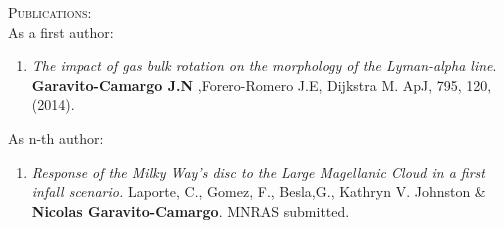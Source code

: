 \documentclass[letterpaper]{article}
\begin{document}
\textsc{\Large Publications:}\\

As a first author:\\
\begin{enumerate}
\item \textit{The impact of gas bulk rotation on the morphology of the
Lyman-alpha line}. \textbf{Garavito-Camargo J.N} ,Forero-Romero J.E, Dijkstra M. ApJ, 795, 120, (2014).\\
\end{enumerate}


As n-th author:\\

\begin{enumerate}
\item  \textit{Response of the Milky Way's disc to the Large Magellanic Cloud in
a first infall scenario.} Laporte, C., Gomez, F., Besla,G., Kathryn V.
Johnston \& \textbf{Nicolas Garavito-Camargo}. MNRAS submitted.\\
\end{enumerate}


\end{document}
